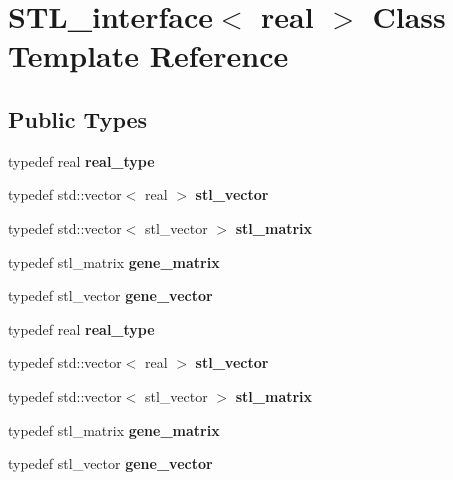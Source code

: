 \hypertarget{class_s_t_l__interface}{}\section{S\+T\+L\+\_\+interface$<$ real $>$ Class Template Reference}
\label{class_s_t_l__interface}
\subsection*{Public Types}
\begin{DoxyCompactItemize}
\item 
\mbox{\label{class_s_t_l__interface_a255060b4db912d711b5f6674fde32ad4}} 
typedef real {\bfseries real\+\_\+type}
\item 
\mbox{\label{class_s_t_l__interface_a90e76ad25a66ae9a35f35ecc2141c1ad}} 
typedef std\+::vector$<$ real $>$ {\bfseries stl\+\_\+vector}
\item 
\mbox{\label{class_s_t_l__interface_a26223b87779685909b8506b5479eb0d8}} 
typedef std\+::vector$<$ stl\+\_\+vector $>$ {\bfseries stl\+\_\+matrix}
\item 
\mbox{\label{class_s_t_l__interface_a85fcdaa2e51b232a9f93f3bf9a8d0ee4}} 
typedef stl\+\_\+matrix {\bfseries gene\+\_\+matrix}
\item 
\mbox{\label{class_s_t_l__interface_ac2dc28dfa4cc8c04a58a00e8bb1ce51f}} 
typedef stl\+\_\+vector {\bfseries gene\+\_\+vector}
\item 
\mbox{\label{class_s_t_l__interface_a255060b4db912d711b5f6674fde32ad4}} 
typedef real {\bfseries real\+\_\+type}
\item 
\mbox{\label{class_s_t_l__interface_a90e76ad25a66ae9a35f35ecc2141c1ad}} 
typedef std\+::vector$<$ real $>$ {\bfseries stl\+\_\+vector}
\item 
\mbox{\label{class_s_t_l__interface_a26223b87779685909b8506b5479eb0d8}} 
typedef std\+::vector$<$ stl\+\_\+vector $>$ {\bfseries stl\+\_\+matrix}
\item 
\mbox{\label{class_s_t_l__interface_a85fcdaa2e51b232a9f93f3bf9a8d0ee4}} 
typedef stl\+\_\+matrix {\bfseries gene\+\_\+matrix}
\item 
\mbox{\label{class_s_t_l__interface_ac2dc28dfa4cc8c04a58a00e8bb1ce51f}} 
typedef stl\+\_\+vector {\bfseries gene\+\_\+vector}
\end{DoxyCompactItemize}

